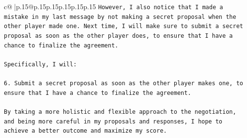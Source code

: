 \documentclass{article}
\begin{document}
{\begin{supertabular}{c@{$\;$}|p{.15\linewidth}@{}p{.15\linewidth}p{.15\linewidth}p{.15\linewidth}p{.15\linewidth}p{.15\linewidth}}
{{{\texttt{However, I also notice that I made a mistake in my last message by not making a secret proposal when the other player made one. Next time, I will make sure to submit a secret proposal as soon as the other player does, to ensure that I have a chance to finalize the agreement.} \\
\\ 
\texttt{Specifically, I will:} \\
\\ 
\texttt{6. Submit a secret proposal as soon as the other player makes one, to ensure that I have a chance to finalize the agreement.} \\
\\ 
\texttt{By taking a more holistic and flexible approach to the negotiation, and being more careful in my proposals and responses, I hope to achieve a better outcome and maximize my score.} \\
            }
        }
    }
     \\ \\

\end{supertabular}
}
\end{document}
